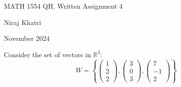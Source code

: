\documentclass[11pt]{exam}
\begin{document}
\thispagestyle{empty}
\begin{center}
    \Large{MATH 1554 QH, Written Assignment 4}
    \vspace{0.5cm}
    
    \large{Niraj Khatri}
    \vspace{0.5cm}
    
    \small{November 2024}
\end{center}
\vspace{1cm}

\begin{questions}
\question[5]
Consider the set of vectors in $\mathbb{R}^3$:
\[
W = \left\{ \begin{pmatrix} 1 \\ 2 \\ 2 \end{pmatrix}, \begin{pmatrix} 3 \\ 0 \\ 3 \end{pmatrix}, \begin{pmatrix} 7 \\ -1 \\ 2 \end{pmatrix} \right\}
\]

\end{questions}
\end{document}
